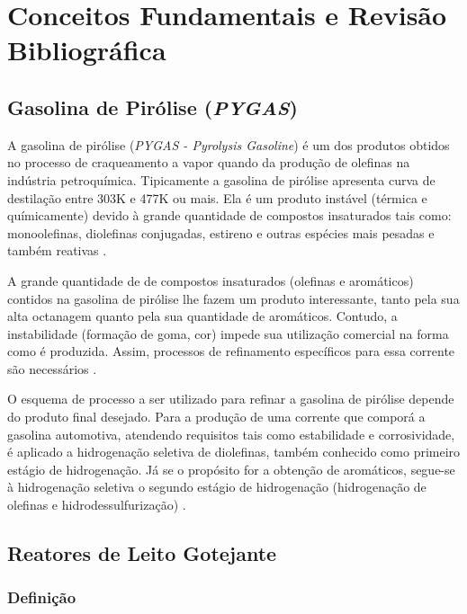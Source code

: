 %
\chapter{Conceitos Fundamentais e Revisão Bibliográfica}
\label{chap:revisaobibliografica}

\section{Gasolina de Pirólise (\emph{PYGAS})} \label{sec:pygas}
A gasolina de pirólise (\emph{PYGAS - Pyrolysis Gasoline}) é um dos produtos
obtidos no processo de craqueamento a vapor quando da produção de olefinas na
indústria petroquímica. Tipicamente a gasolina de pirólise apresenta curva de
destilação entre 303K e 477K ou mais. Ela é um produto instável (térmica e
químicamente) devido à grande quantidade de compostos insaturados tais como:
monoolefinas, diolefinas conjugadas, estireno e outras espécies mais pesadas e
também reativas \cite{Cheng1986}.
 
A grande quantidade de de compostos insaturados (olefinas e aromáticos) contidos
na gasolina de pirólise lhe fazem um produto interessante, tanto pela
sua alta octanagem quanto pela sua quantidade de aromáticos. Contudo, a
instabilidade (formação de goma, cor) impede sua utilização comercial na forma como é produzida. Assim,
processos de refinamento específicos para essa corrente são necessários
\cite{Derrien1986}.

O esquema de processo a ser utilizado para refinar a gasolina de pirólise
depende do produto final desejado. Para a produção de uma corrente que
comporá a gasolina automotiva, atendendo requisitos tais como estabilidade e
corrosividade, é aplicado a hidrogenação seletiva de diolefinas, também
conhecido como primeiro estágio de hidrogenação. Já se o propósito for a
obtenção de aromáticos, segue-se à hidrogenação seletiva o segundo estágio
de hidrogenação (hidrogenação de olefinas e hidrodessulfurização)
\cite{Derrien1986}.

\section{Reatores de Leito Gotejante} \label{sec:reatorestbr}

\subsection{Definição} \label{sec:definicao}

